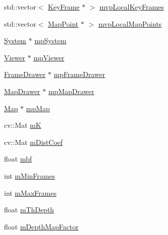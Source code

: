 \begin{DoxyCompactItemize}
\item 
std\+::vector$<$ \mbox{\hyperlink{class_o_r_b___s_l_a_m2_1_1_key_frame}{Key\+Frame}} $\ast$ $>$ \mbox{\hyperlink{class_o_r_b___s_l_a_m2_1_1_tracking_a46ade9f7ec2c89544ae77f2906000b3a}{mvp\+Local\+Key\+Frames}}
\item 
std\+::vector$<$ \mbox{\hyperlink{class_o_r_b___s_l_a_m2_1_1_map_point}{Map\+Point}} $\ast$ $>$ \mbox{\hyperlink{class_o_r_b___s_l_a_m2_1_1_tracking_a89074acc520094ba0d0fc7f4c0f8cf09}{mvp\+Local\+Map\+Points}}
\item 
\mbox{\hyperlink{class_o_r_b___s_l_a_m2_1_1_system}{System}} $\ast$ \mbox{\hyperlink{class_o_r_b___s_l_a_m2_1_1_tracking_a1ab3d15e53005d5147620b0ee37c33ed}{mp\+System}}
\item 
\mbox{\hyperlink{class_o_r_b___s_l_a_m2_1_1_viewer}{Viewer}} $\ast$ \mbox{\hyperlink{class_o_r_b___s_l_a_m2_1_1_tracking_a4952ab24b73effdbba6266e2fb26548e}{mp\+Viewer}}
\item 
\mbox{\hyperlink{class_o_r_b___s_l_a_m2_1_1_frame_drawer}{Frame\+Drawer}} $\ast$ \mbox{\hyperlink{class_o_r_b___s_l_a_m2_1_1_tracking_afc0759bfbd1d8d83e86c9d677a35429b}{mp\+Frame\+Drawer}}
\item 
\mbox{\hyperlink{class_o_r_b___s_l_a_m2_1_1_map_drawer}{Map\+Drawer}} $\ast$ \mbox{\hyperlink{class_o_r_b___s_l_a_m2_1_1_tracking_a3fb103211ff7b984910943f0975d5ceb}{mp\+Map\+Drawer}}
\item 
\mbox{\hyperlink{class_o_r_b___s_l_a_m2_1_1_map}{Map}} $\ast$ \mbox{\hyperlink{class_o_r_b___s_l_a_m2_1_1_tracking_acc0b5ae59012946da8238d84a331d72c}{mp\+Map}}
\item 
cv\+::\+Mat \mbox{\hyperlink{class_o_r_b___s_l_a_m2_1_1_tracking_a6926ae3c49c09bf9f402d13900740405}{mK}}
\item 
cv\+::\+Mat \mbox{\hyperlink{class_o_r_b___s_l_a_m2_1_1_tracking_a7df0851817d1a1345324c196b6a79c3a}{m\+Dist\+Coef}}
\item 
float \mbox{\hyperlink{class_o_r_b___s_l_a_m2_1_1_tracking_a8de5f87734670485f6b6097b14dd1fcb}{mbf}}
\item 
int \mbox{\hyperlink{class_o_r_b___s_l_a_m2_1_1_tracking_a53369ce9ebf152a1a76e93445821e395}{m\+Min\+Frames}}
\item 
int \mbox{\hyperlink{class_o_r_b___s_l_a_m2_1_1_tracking_a8a96fe16c7ed5c29d8714c1af036f1da}{m\+Max\+Frames}}
\item 
float \mbox{\hyperlink{class_o_r_b___s_l_a_m2_1_1_tracking_aded3124bdf36aba88411327024a7c2d3}{m\+Th\+Depth}}
\item 
float \mbox{\hyperlink{class_o_r_b___s_l_a_m2_1_1_tracking_abbe2cb26c58f023bab9c95b251778208}{m\+Depth\+Map\+Factor}}

\end{DoxyCompactItemize}
